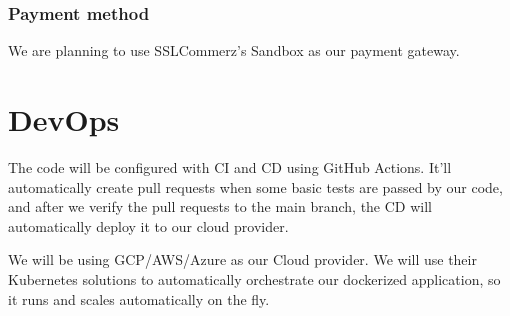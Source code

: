 \documentclass[12pt]{article}
\begin{document}
\subsubsection{Payment method}
We are planning to use SSLCommerz's Sandbox as our payment gateway.

\section{DevOps}
The code will be configured with CI and CD using GitHub Actions. It'll automatically create pull requests when some basic tests are passed by our code, and after we verify the pull requests to the main branch, the CD will automatically deploy it to our cloud provider. \par
We will be using GCP/AWS/Azure as our Cloud provider. We will use their Kubernetes solutions to automatically orchestrate our dockerized application, so it runs and scales automatically on the fly.
\end{document}
